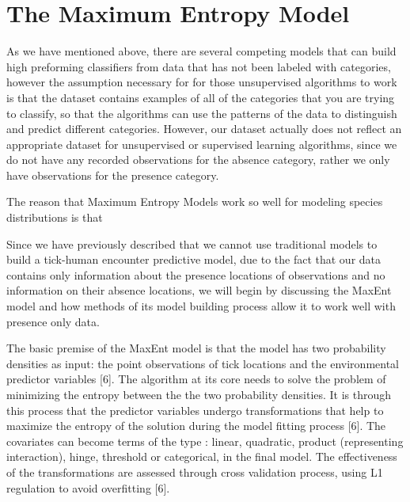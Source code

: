 



\section{The Maximum Entropy Model}

As we have mentioned above, there are several competing models that can build high preforming classifiers from data that has not been labeled with categories, however the assumption necessary for for those unsupervised algorithms to work is that the dataset contains examples of all of the categories that you are trying to classify, so that the algorithms can use the patterns of the data to distinguish and predict different categories. However, our dataset actually does not reflect an appropriate dataset for unsupervised or supervised learning algorithms, since we do not have any recorded observations for the absence category, rather we only have observations for the presence category. 


The reason that Maximum Entropy Models work so well for modeling species distributions is that 

Since we have previously described that we cannot use traditional models to build a tick-human encounter predictive model, due to the fact that our data contains only information about the presence locations of observations and no information on their absence locations, we will begin by discussing the MaxEnt model and how methods of its model building process allow it to work well with presence only data. \newline

\noindent The basic premise of the MaxEnt model is that the model has two probability densities as input: the point observations of tick locations and the environmental predictor variables [6]. The algorithm at its core needs to solve the problem of minimizing the entropy between the the two probability densities. It is through this process that the predictor variables undergo transformations that help to maximize the entropy of the solution during the model fitting process [6]. The covariates can become terms of the type : linear, quadratic, product (representing interaction), hinge, threshold or categorical, in the final model. The effectiveness of the transformations are assessed through cross validation process, using L1 regulation to avoid overfitting [6].  \newline

